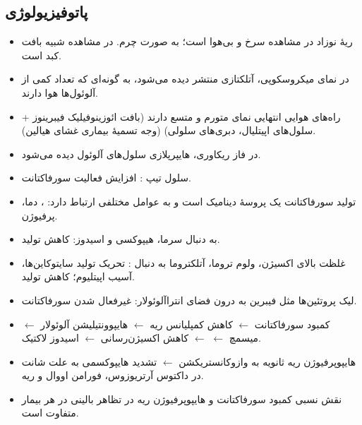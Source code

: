\documentclass[12pt,a4paper]{article}
\begin{document}
\subsection*{پاتوفیزیولوژی }
\begin{itemize}
\item ریهٔ نوزاد  در مشاهده سرخ و بی‌هوا است؛ به صورت چرم. در مشاهده شبیه بافت کبد است.
\item در نمای میکروسکوپی، آتلکتازی منتشر دیده می‌شود، به گونه‌ای که تعداد کمی از آلوئول‌ها هوا دارند.
\item راه‌های هوایی انتهایی نمای متورم و متسع دارند (بافت ائوزینوفیلیک فیبرینوز + سلول‌های اپیتلیال، دبری‌های سلولی) (وجه تسمیهٔ بیماری غشای هیالین).
\item در فاز ریکاوری، هایپرپلازی سلول‌های آلوئول دیده می‌شود.
\item سلول تیپ : افزایش فعالیت سورفاکتانت.
\item تولید سورفاکتانت یک پروسهٔ دینامیک است و به عوامل مختلفی ارتباط دارد: ، دما، پرفیوژن.
\item به دنبال سرما، هیپوکسی و اسیدوز: کاهش تولید.
\end{itemize}

\begin{itemize}
\item غلظت بالای اکسیژن، ولوم تروما، آتلکتروما به دنبال : تحریک تولید سایتوکاین‌ها، آسیب اپیتلیوم؛ کاهش تولید.
\item لیک پروتئین‌ها مثل فیبرین به درون فضای انترا‌آلوئولار: غیرفعال شدن سورفاکتانت.
\item کمبود سورفاکتانت $\leftarrow$ کاهش کمپلیانس ریه $\leftarrow$ هایپوونتیلیشن آلوئولار $\leftarrow$  میسمچ $\leftarrow$  $\leftarrow$ کاهش اکسیژن‌رسانی $\leftarrow$ اسیدوز لاکتیک.
\item هایپوپرفیوژن ریه ثانویه به وازوکانستریکشن $\leftarrow$ تشدید هایپوکسمی به علت شانت  در داکتوس آرتریوزوس، فورامن اووال و ریه.
\item نقش نسبی کمبود سورفاکتانت و هایپوپرفیوژن ریه در تظاهر بالینی  در هر بیمار متفاوت است.
\end{itemize}
\end{document}
